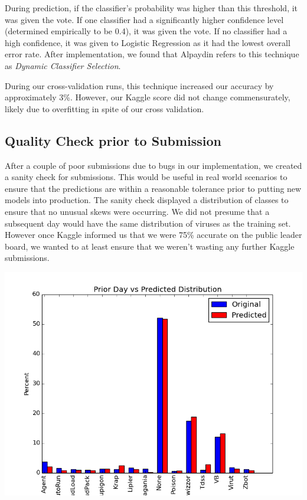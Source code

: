 \documentclass[11pt, oneside]{article}   	%
\begin{document}
During prediction, if the classifier's probability was higher than this threshold, it was given the vote. If one classifier had a significantly higher confidence level (determined empirically to be 0.4), it was given the vote. If no classifier had a high confidence, it was given to Logistic Regression as it had the lowest overall error rate. After implementation, we found that Alpaydin refers to this technique as \emph{Dynamic Classifier Selection}.\cite{alpaydin}



During our cross-validation runs, this technique increased our accuracy by approximately 3\%. However, our Kaggle score did not change commensurately, likely due to overfitting in spite of our cross validation. 


\subsection*{Quality Check prior to Submission}

After a couple of poor submissions due to bugs in our implementation, we created a sanity check for submissions. This would be useful in real world scenarios to ensure that the predictions are within a reasonable tolerance prior to putting new models into production. The sanity check displayed a distribution of classes to ensure that no unusual skews were occurring. We did not presume that a subsequent day would have the same distribution of viruses as the training set. However once Kaggle informed us that we were 75\% accurate on the public leader board, we wanted to at least ensure that we weren't wasting any further Kaggle submissions. 

\includegraphics[scale=.65]{predictVactual}
\end{document}
